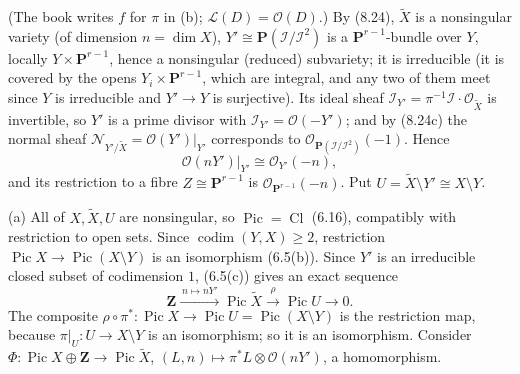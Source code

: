 \documentclass[11pt]{article}
\begin{document}
\pf
(The book writes $f$ for $\pi$ in (b); $\mathcal L(D)=\mathcal O(D)$.) By (8.24), $\widetilde X$ is a nonsingular variety (of dimension $n=\dim X$), $Y'\cong\mathbf P(\mathcal I/\mathcal I^2)$ is a $\mathbf P^{r-1}$-bundle over $Y$, locally $Y\times\mathbf P^{r-1}$, hence a nonsingular (reduced) subvariety; it is irreducible (it is covered by the opens $Y_i\times\mathbf P^{r-1}$, which are integral, and any two of them meet since $Y$ is irreducible and $Y'\to Y$ is surjective). Its ideal sheaf $\mathcal I_{Y'}=\pi^{-1}\mathcal I\cdot\mathcal O_{\widetilde X}$ is invertible, so $Y'$ is a prime divisor with $\mathcal I_{Y'}=\mathcal O(-Y')$; and by (8.24c) the normal sheaf $\mathcal N_{Y'/\widetilde X}=\mathcal O(Y')|_{Y'}$ corresponds to $\mathcal O_{\mathbf P(\mathcal I/\mathcal I^2)}(-1)$. Hence
\[\mathcal O(nY')|_{Y'}\cong\mathcal O_{Y'}(-n),\tag{1}\]
and its restriction to a fibre $Z\cong\mathbf P^{r-1}$ is $\mathcal O_{\mathbf P^{r-1}}(-n)$. Put $U=\widetilde X\setminus Y'\cong X\setminus Y$.

(a) All of $X,\widetilde X,U$ are nonsingular, so $\operatorname{Pic}=\operatorname{Cl}$ (6.16), compatibly with restriction to open sets. Since $\operatorname{codim}(Y,X)\ge2$, restriction $\operatorname{Pic}X\to\operatorname{Pic}(X\setminus Y)$ is an isomorphism (6.5(b)). Since $Y'$ is an irreducible closed subset of codimension $1$, (6.5(c)) gives an exact sequence
\[\mathbf Z\xrightarrow{\,n\mapsto nY'\,}\operatorname{Pic}\widetilde X\xrightarrow{\ \rho\ }\operatorname{Pic}U\to0.\]
The composite $\rho\circ\pi^*:\operatorname{Pic}X\to\operatorname{Pic}U=\operatorname{Pic}(X\setminus Y)$ is the restriction map, because $\pi|_U:U\to X\setminus Y$ is an isomorphism; so it is an isomorphism. Consider $\Phi:\operatorname{Pic}X\oplus\mathbf Z\to\operatorname{Pic}\widetilde X$, $(L,n)\mapsto\pi^*L\otimes\mathcal O(nY')$, a homomorphism.
\end{document}
